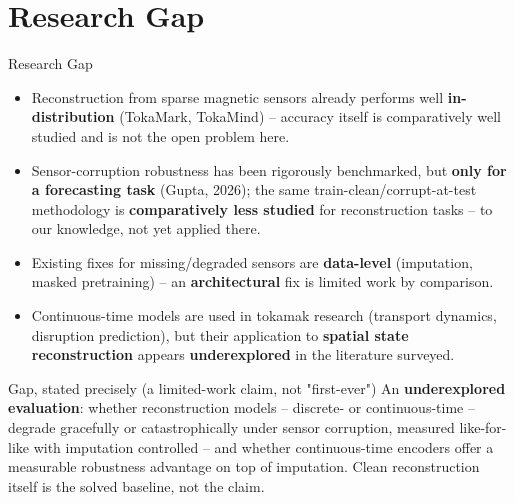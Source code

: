 \documentclass[aspectratio=169]{beamer}
\begin{document}
\section{Research Gap}
\begin{frame}{Research Gap}
  \small
  \begin{itemize}
    \item Reconstruction from sparse magnetic sensors already performs well
      \textbf{in-distribution} (TokaMark, TokaMind) -- accuracy itself is
      comparatively well studied and is not the open problem here.
    \item Sensor-corruption robustness has been rigorously benchmarked, but
      \textbf{only for a forecasting task} (Gupta, 2026); the same
      train-clean/corrupt-at-test methodology is \textbf{comparatively less
      studied} for reconstruction tasks -- to our knowledge, not yet applied
      there.
    \item Existing fixes for missing/degraded sensors are \textbf{data-level}
      (imputation, masked pretraining) -- an \textbf{architectural} fix is
      limited work by comparison.
    \item Continuous-time models are used in tokamak research (transport
      dynamics, disruption prediction), but their application to
      \textbf{spatial state reconstruction} appears \textbf{underexplored}
      in the literature surveyed.
  \end{itemize}
  \vspace{6pt}
  \begin{block}{Gap, stated precisely (a limited-work claim, not "first-ever")}
    \small An \textbf{underexplored evaluation}: whether reconstruction
    models -- discrete- or continuous-time -- degrade gracefully or
    catastrophically under sensor corruption, measured like-for-like with
    imputation controlled -- and whether continuous-time encoders offer a
    measurable robustness advantage on top of imputation. Clean reconstruction
    itself is the solved baseline, not the claim.
  \end{block}
\end{frame}

\end{document}

